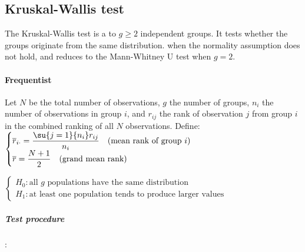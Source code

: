 \subsection{Kruskal-Wallis test}

The Kruskal-Wallis test is a  to
$g \geq 2$ independent groups. It tests whether the groups originate from the same
distribution.  when the
normality assumption does not hold, and reduces to the Mann-Whitney U test when $g = 2$.

\paragraph{Frequentist}

Let $N$ be the total number of observations, $g$ the number of groups, $n_i$ the number
of observations in group $i$, and $r_{ij}$ the rank of observation $j$ from group $i$ in
the combined ranking of all $N$ observations. Define:
$\begin{cases}
    \overline{r}_{i\cdot} = \dfrac{\su{j=1}{n_{i}}r_{ij}}{n_{i}} \quad \text{(mean rank of group } i\text{)}\\
    \overline{r} = \dfrac{N + 1}{2} \quad \text{(grand mean rank)}
\end{cases}$

$\begin{cases}
    H_0: \text{all } g \text{ populations have the same distribution} \\
    H_1: \text{at least one population tends to produce larger values}
\end{cases}$

\subparagraph{Test procedure}:

